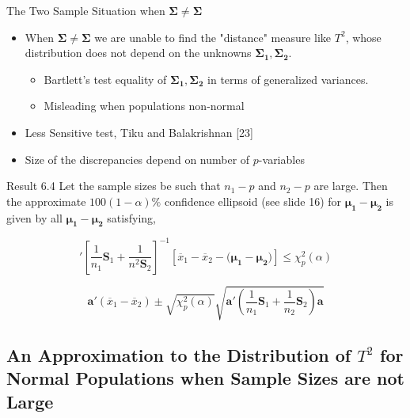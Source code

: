 \documentclass[8pt]{beamer}
\begin{document}
    \begin{frame}{The Two Sample Situation when $\mathbf{\Sigma \neq \Sigma}$}
        \begin{itemize}
            \item When $\mathbf{\Sigma \neq \Sigma}$ we are unable to find the "distance" measure like $T^{2}$, whose distribution does not depend on the unknowns $\mathbf{\Sigma_{1},\Sigma_{2}}$.
            \begin{itemize}
                \item Bartlett's test equality of $\mathbf{\Sigma_{1}},\mathbf{\Sigma_{2}}$ in terms of generalized variances. 
                \item Misleading when populations non-normal
            \end{itemize}
        \item Less Sensitive test, Tiku and Balakrishnan [23]
        \item Size of the discrepancies depend on number of $p$-variables
        \end{itemize}
        
        \begin{block}{Result 6.4}
            Let the sample sizes be such that $n_{1} - p$ and $n_{2} - p$ are large. Then the approximate $100(1 - \alpha)\%$ confidence ellipsoid (see slide 16) for $\mathbf{\mu_{1} - \mu_{2}}$ is given by all $\mathbf{\mu_{1} - \mu_{2}}$ satisfying, 
            
            \begin{equation*}
                [\overline{x}_{1} - \overline{x}_{2} - (\mathbf{\mu_{1} - \mu_{2})}]'\left[\frac{1}{n_{1}}\mathbf{S}_{1} + \frac{1}{n^{2}\mathbf{S}_{2}}\right]^{-1}[\overline{x}_{1} - \overline{x}_{2} - (\mathbf{\mu_{1} - \mu_{2})}] \leq \chi^{2}_{p}(\alpha)
            \end{equation*}
            
            \begin{equation*}
                \mathbf{a}'(\overline{x}_{1} - \overline{x}_{2}) \pm \sqrt{\chi_{p}^{2}(\alpha)}\sqrt{\mathbf{a'}\left(\frac{1}{n_{1}}\mathbf{S}_{1} + \frac{1}{n_{2}}\mathbf{S}_{2}\right)\mathbf{a}}
            \end{equation*}
        \end{block}
    \end{frame}
    
\subsection{An Approximation to the Distribution of $T^{2}$ for Normal Populations when Sample Sizes are not Large}
\end{document}
